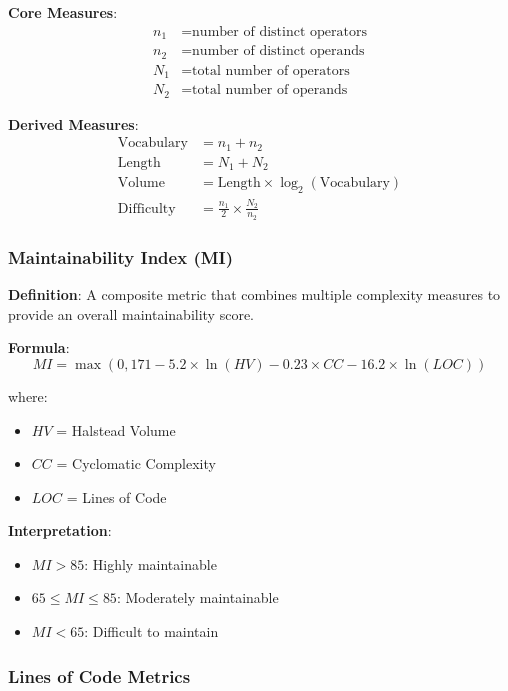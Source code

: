 \documentclass[11pt,a4paper]{article}
\begin{document}
\textbf{Core Measures}:
\begin{align}
n_1 &= \text{number of distinct operators} \\
n_2 &= \text{number of distinct operands} \\
N_1 &= \text{total number of operators} \\
N_2 &= \text{total number of operands}
\end{align}

\textbf{Derived Measures}:
\begin{align}
\text{Vocabulary} &= n_1 + n_2 \\
\text{Length} &= N_1 + N_2 \\
\text{Volume} &= \text{Length} \times \log_2(\text{Vocabulary}) \\
\text{Difficulty} &= \frac{n_1}{2} \times \frac{N_2}{n_2}
\end{align}

\subsubsection{Maintainability Index (MI)}

\textbf{Definition}: A composite metric that combines multiple complexity measures to provide an overall maintainability score.

\textbf{Formula}:
\begin{equation}
MI = \max(0, 171 - 5.2 \times \ln(HV) - 0.23 \times CC - 16.2 \times \ln(LOC))
\end{equation}

where:
\begin{itemize}
    \item $HV$ = Halstead Volume
    \item $CC$ = Cyclomatic Complexity
    \item $LOC$ = Lines of Code
\end{itemize}

\textbf{Interpretation}:
\begin{itemize}
    \item $MI > 85$: Highly maintainable
    \item $65 \leq MI \leq 85$: Moderately maintainable
    \item $MI < 65$: Difficult to maintain
\end{itemize}

\subsubsection{Lines of Code Metrics}
\end{document}
